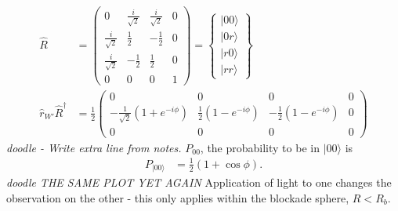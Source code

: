 \documentclass[a4paper, 11pt, normalem]{report}
\begin{document}
\begin{align}
    \hat{R} &= \begin{pmatrix} 0 & \frac{i}{\sqrt{2}} & \frac{i}{\sqrt{2}} & 0 \\ \frac{i}{\sqrt{2}} & \frac12 & -\frac12 & 0 \\ \frac{i}{\sqrt{2}} & -\frac12 & \frac12 & 0 \\ 0 & 0 & 0 & 1 \end{pmatrix} = \begin{Bmatrix} |00\rangle \\ |0r\rangle \\ |r0\rangle \\ |rr\rangle \end{Bmatrix} \\
    \hat{r}_{W'}\hat{R}^\dagger &= \frac12 \begin{pmatrix} 0 & 0 & 0 & 0 \\ -\frac{1}{\sqrt{2}}\left(1+e^{-i\phi}\right) & \frac12(1-e^{-i\phi}) & -\frac12(1-e^{-i\phi}) & 0 \\ 0 & 0 & 0 & 0 \end{pmatrix}
\end{align}
\emph{doodle - Write extra line from notes.}
$P_{00}$, the probability to be in $|00\rangle$ is
\begin{align}
    P_{|00\rangle} &= \frac12(1+\cos\phi).
\end{align}
\emph{doodle THE SAME PLOT YET AGAIN}
Application of light to one changes the observation on the other - this only applies within the blockade sphere, $R<R_b$.
\end{document}
